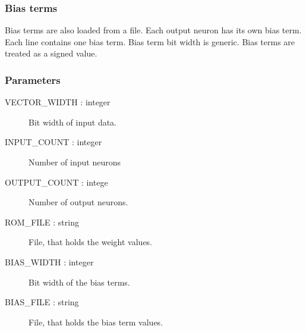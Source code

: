 \subsubsection{Bias terms}

Bias terms are also loaded from a file. Each output neuron has its own bias term. Each line contains one bias term. Bias term bit width is generic. Bias terms are treated as a signed value.
	

\subsubsection{Parameters}
\begin{description}
	\item [VECTOR\_WIDTH   : integer] Bit width of input data.
	\item [INPUT\_COUNT    : integer] Number of input neurons
	\item [OUTPUT\_COUNT   : intege] Number of output neurons.
	\item [ROM\_FILE       : string] File, that holds the weight values.
	\item [BIAS\_WIDTH     : integer] Bit width of the bias terms.
	\item [BIAS\_FILE      : string] File, that holds the bias term values.
\end{description}



